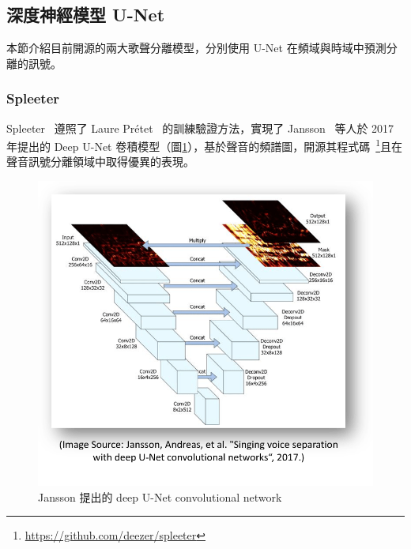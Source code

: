 \subsection{深度神經模型 U-Net}
本節介紹目前開源的兩大歌聲分離模型，分別使用 U-Net 在頻域與時域中預測分離的訊號。

\subsubsection{Spleeter}
Spleeter~\cite{hennequin2020spleeter} 遵照了 Laure Prétet ~\cite{pretet2019singing}的訓練驗證方法，實現了 Jansson~\cite{jansson2017singing} 等人於 2017 年提出的 Deep U-Net 卷積模型（圖\ref{spleeter1}），基於聲音的頻譜圖，開源其程式碼~\footnote{\url{https://github.com/deezer/spleeter}}且在聲音訊號分離領域中取得優異的表現。

\begin{figure}[htbp]
    \hfil
    \begin{minipage}[t]{0.55\textwidth}
        \includegraphics[width=\textwidth]{./figures/chapter02_method/spleeter1.png}
        \caption {Jansson 提出的 deep U-Net convolutional network}
        \label{spleeter1}
    \end{minipage}
    \hfil
\end{figure}

